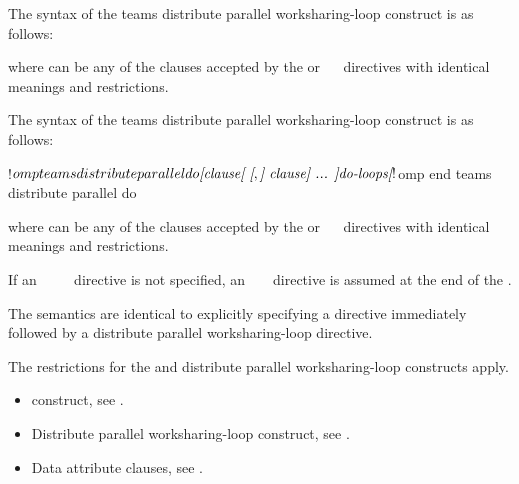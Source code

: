 \syntax
\begin{ccppspecific}
The syntax of the teams distribute parallel worksharing-loop construct is as follows:

\begin{ompcPragma}[fontsize=\small]
#pragma omp teams distribute parallel for \plc{\}
            \plc{[clause[ [},\plc{] clause] ...  ] new-line}
    \plc{for-loops}
\end{ompcPragma}

where  can be any of the clauses accepted by the  or
~~ directives with identical meanings and restrictions.
\end{ccppspecific}

\begin{fortranspecific}
The syntax of the teams distribute parallel worksharing-loop construct is as follows:

\begin{ompfPragma}
!$omp teams distribute parallel do \plc{[clause[ [},\plc{] clause] ... ]}
   \plc{do-loops}
\plc{[} !$omp end teams distribute parallel do \plc{]}
\end{ompfPragma}

where  can be any of the clauses accepted by the  or
~~ directives with identical meanings and restrictions.

If an ~~~~ directive is not specified, an
~  ~ directive is assumed at the end of the .
\end{fortranspecific}

\descr
The semantics are identical to explicitly specifying a  directive immediately
followed by a distribute parallel worksharing-loop directive.

\restrictions
The restrictions for the  and distribute parallel worksharing-loop constructs apply.

\crossreferences
\begin{itemize}
\item {} construct, see
.

\item Distribute parallel worksharing-loop construct, see
.

\item Data attribute clauses, see
.
\end{itemize}









